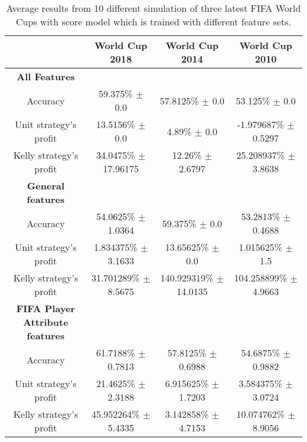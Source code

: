 \begin{sidewaystable}
    \caption{Average results from 10 different simulation of three latest FIFA World Cups with score model which is trained with different feature sets.}
    \begin{tabular}{ | c |c| c | c |}
    \hline
    & World Cup 2018 & World Cup 2014 & World Cup 2010 \\
    \hline
    \textbf{All Features} \\
    \hline
    Accuracy & 59.375\% $\pm$ 0.0 & 57.8125\% $\pm$ 0.0 & 53.125\% $\pm$ 0.0 \\
    Unit strategy's profit & 13.5156\% $\pm$ 0.0 & 4.89\%  $\pm$ 0.0 & -1.979687\% $\pm$ 0.5297 \\
    Kelly strategy's profit & 34.0475\% $\pm$ 17.96175 & 12.26\% $\pm$ 2.6797 & 25.208937\% $\pm$ 3.8638 \\
    \hline
    \textbf{General features} \\
    \hline
    Accuracy & 54.0625\% $\pm$ 1.0364 & 59.375\% $\pm$ 0.0 & 53.2813\% $\pm$ 0.4688 \\
    Unit strategy's profit & 1.834375\% $\pm$ 3.1633 & 13.65625\% $\pm$ 0.0 & 1.015625\% $\pm$ 1.5 \\
    Kelly strategy's profit & 31.701289\% $\pm$ 8.5675 & 140.929319\% $\pm$ 14.0135 & 104.258899\% $\pm$ 4.9663 \\
    \hline
    \textbf{FIFA Player Attribute features} \\
    \hline
    Accuracy & 61.7188\% $\pm$ 0.7813 & 57.8125\% $\pm$ 0.6988 & 54.6875\% $\pm$ 0.9882 \\
    Unit strategy's profit & 21.4625\% $\pm$ 2.3188 & 6.915625\% $\pm$ 1.7203 & 3.584375\% $\pm$ 3.0724 \\
    Kelly strategy's profit & 45.952264\% $\pm$ 5.4335 & 3.142858\% $\pm$ 4.7153 & 10.074762\% $\pm$ 8.9056 \\
    \hline
   \end{tabular}
\end{sidewaystable}

